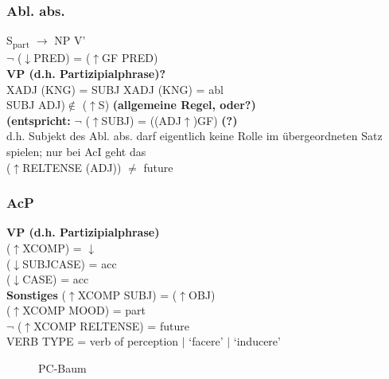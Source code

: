 \documentclass[12pt,a4paper]{article}
\begin{document}
\subsubsection{Abl. abs.}

S\textsubscript{part} $\rightarrow$ NP \: V'\\
$\neg$ ($\downarrow$PRED) = ($\uparrow$GF PRED)\\

\textbf{VP (d.h. Partizipialphrase)?}\\

XADJ (KNG) = SUBJ XADJ (KNG) = abl\\
SUBJ ADJ)$\notin$ ($\uparrow$S) \textbf{(allgemeine Regel, oder?)} \\
\textbf{(entspricht:}   $\neg$ ($\uparrow$SUBJ) = ((ADJ$\uparrow$)GF) \textbf{(?)} \\
d.h. Subjekt des Abl. abs. darf eigentlich keine Rolle im übergeordneten Satz spielen; nur bei AcI geht das\\
($\uparrow$RELTENSE (ADJ)) $\neq$ future


\subsubsection{AcP}

\textbf{VP (d.h. Partizipialphrase)}\\
($\uparrow$XCOMP) = $\downarrow$\\
($\downarrow$SUBJCASE) = acc\\
($\downarrow$CASE) = acc\\

\textbf{Sonstiges}
($\uparrow$XCOMP SUBJ) = ($\uparrow$OBJ)\\
($\uparrow$XCOMP MOOD) = part\\
$\neg$ ($\uparrow$XCOMP RELTENSE) = future\\
VERB TYPE = verb of perception $\mid$ `facere' $\mid$ `inducere'


\begin{figure}[!ht]
  \caption{PC-Baum}
  \label{MyTree}
\end{figure}
\end{document}
